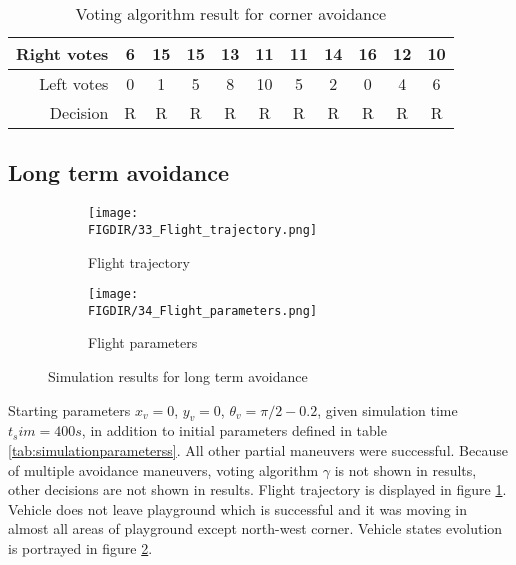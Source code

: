 \begin{table}[H]
    \centering
    \begin{tabular}{|r||c|c|c|c|c|c|c|c|c|c|}
        \hline
        Right votes & 6 & 15 & 15 & 13 & 11 & 11 & 14 & 16 & 12 & 10\\
        \hline
        Left votes  & 0 &  1 &  5 &  8 & 10 &  5 &  2 &  0 &  4 &  6\\
        \hline\hline
        Decision    & R & R  &  R &  R &  R &  R &  R &  R &  R &  R\\
        \hline
    \end{tabular}
    \caption{Voting algorithm result for corner avoidance}
    \label{tab:avoidancecorner}
\end{table}


\subsection{Long term avoidance} 
\begin{figure}[H]
    \begin{subfigure}{0.5\textwidth}
    \texttt{[image: \\FIGDIR/33\_Flight\_trajectory.png]} 
    \caption{Flight trajectory}
    \label{fig:33Flighttrajectory}
    \end{subfigure}
    \begin{subfigure}{0.5\textwidth}
    \texttt{[image: \\FIGDIR/34\_Flight\_parameters.png]}
    \caption{Flight parameters}
    \label{fig:34Flightparameters}
    \end{subfigure}
\caption{Simulation results for long term avoidance}
\label{fig:Simulationlongterm}
\end{figure}

Starting parameters $x_v = 0$, $y_v = 0$, $\theta_v = \pi/2 - 0.2 $, given simulation time $t_sim =  400 s$, in addition to initial parameters defined in table \ref{tab:simulationparameterss}. All other partial maneuvers were successful. Because of multiple avoidance maneuvers, voting algorithm $\gamma$ is not shown in results, other decisions are not shown in results. Flight trajectory is displayed in figure \ref{fig:33Flighttrajectory}. Vehicle does not leave playground which is successful and it was moving in almost all areas of playground except north-west corner. Vehicle states evolution is portrayed in figure \ref{fig:34Flightparameters}. 